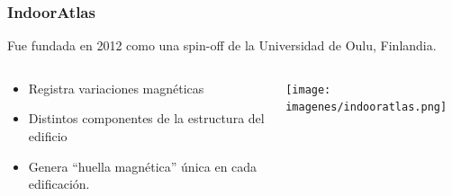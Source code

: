 \documentclass[12pt]{beamer}
\begin{document}
\begin{frame}
	\frametitle{IndoorAtlas}
	\begin{block}{}
		Fue fundada en 2012 como una spin-off de la Universidad de Oulu, Finlandia. \cite{apiIndoorAtlas}
	\end{block}
	\begin{columns} 
		\begin{column}{5cm}
			\begin{itemize}
				\item Registra variaciones magnéticas
				\item Distintos componentes de la estructura del edificio
				\item Genera ``huella magnética'' única en cada edificación.
			\end{itemize}
		\end{column}
		\begin{column}{6cm} 
			\begin{center}
				\texttt{[image: imagenes/indooratlas.png]}
			\end{center} 
		\end{column} 
	\end{columns}
\end{frame}
\end{document}
